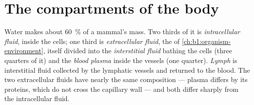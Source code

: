 \section{The compartments of the body}

\begin{definition}\label{def:b1:mammal-organization:compartments}
Water makes about \qty{60}{\%} of a mammal's mass. Two thirds of it is
\emph{intracellular fluid}, inside the cells;
one third is \emph{extracellular fluid},
the  of \cref{ch:b1:organism-environment}, itself
divided into the \emph{interstitial fluid}
bathing the cells (three quarters of it) and the \emph{blood
plasma} inside the vessels (one quarter). \emph{Lymph}
is interstitial fluid collected by the lymphatic vessels and returned
to the blood. The two extracellular fluids have nearly the same
composition --- plasma differs by its proteins, which do not cross the
capillary wall --- and both differ sharply from the intracellular fluid.
\end{definition}

